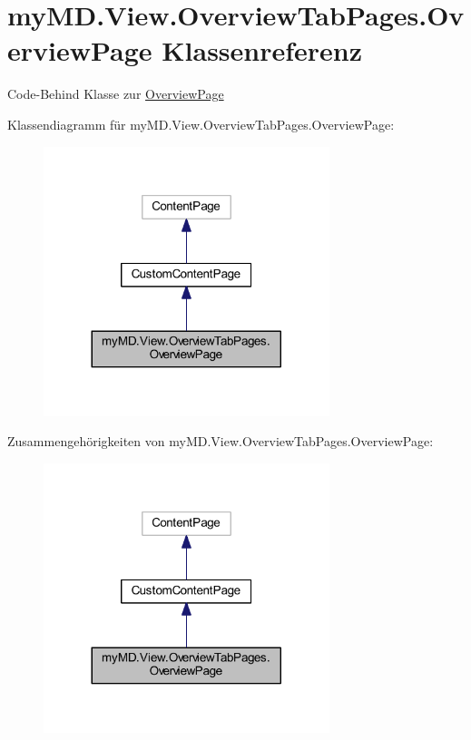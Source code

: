 \hypertarget{classmy_m_d_1_1_view_1_1_overview_tab_pages_1_1_overview_page}{}\section{my\+M\+D.\+View.\+Overview\+Tab\+Pages.\+Overview\+Page Klassenreferenz}
\label{classmy_m_d_1_1_view_1_1_overview_tab_pages_1_1_overview_page}


Code-\/\+Behind Klasse zur \mbox{\hyperlink{classmy_m_d_1_1_view_1_1_overview_tab_pages_1_1_overview_page}{Overview\+Page}}  




Klassendiagramm für my\+M\+D.\+View.\+Overview\+Tab\+Pages.\+Overview\+Page\+:\nopagebreak
\begin{figure}[H]
\begin{center}
\leavevmode
\includegraphics[width=236pt]{classmy_m_d_1_1_view_1_1_overview_tab_pages_1_1_overview_page__inherit__graph}
\end{center}
\end{figure}


Zusammengehörigkeiten von my\+M\+D.\+View.\+Overview\+Tab\+Pages.\+Overview\+Page\+:\nopagebreak
\begin{figure}[H]
\begin{center}
\leavevmode
\includegraphics[width=236pt]{classmy_m_d_1_1_view_1_1_overview_tab_pages_1_1_overview_page__coll__graph}
\end{center}
\end{figure}
